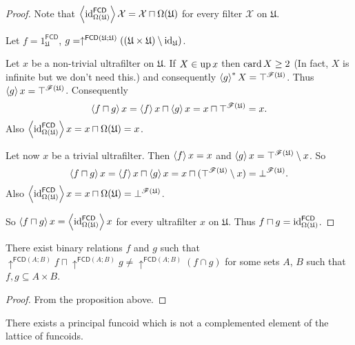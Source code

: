 \begin{proof}
Note that $\left\langle \operatorname{id}_{\Omega(\mathfrak{U})}^{\mathsf{FCD}}\right\rangle\mathcal{X}=\mathcal{X}\sqcap\Omega(\mathfrak{U})$
for every filter $\mathcal{X}$ on $\mathfrak{U}$.

Let $f=1_{\mathfrak{U}}^{\mathsf{FCD}}$, $g=\uparrow^{\mathsf{FCD}(\mathfrak{U};\mathfrak{U})}((\mathfrak{U}\times\mathfrak{U})\setminus\operatorname{id}_{\mathfrak{U}})$.

Let $x$ be a non-trivial ultrafilter on $\mathfrak{U}$. If $X\in\operatorname{up} x$
then $\operatorname{card} X\ge2$ (In fact, $X$ is infinite but we don't need this.)
and consequently $\left\langle g\right\rangle ^{\ast}X=\top^{\mathscr{F}(\mathfrak{U})}$.
Thus $\left\langle g\right\rangle x=\top^{\mathscr{F}(\mathfrak{U})}$. Consequently
\[
\left\langle f\sqcap g\right\rangle x=\left\langle f\right\rangle x\sqcap\left\langle g\right\rangle x=x\sqcap\top^{\mathscr{F}(\mathfrak{U})}=x.
\]
Also $\left\langle \operatorname{id}_{\Omega(\mathfrak{U})}^{\mathsf{FCD}}\right\rangle x=x\sqcap\Omega(\mathfrak{U})=x$.

Let now $x$ be a trivial ultrafilter. Then $\left\langle f\right\rangle x=x$ and $\left\langle g\right\rangle x=\top^{\mathscr{F}(\mathfrak{U})}\setminus x$.
So
\[
\left\langle f\sqcap g\right\rangle x=\left\langle f\right\rangle x\sqcap\left\langle g\right\rangle x=x\sqcap(\top^{\mathscr{F}(\mathfrak{U})}\setminus x)=\bot^{\mathscr{F}(\mathfrak{U})}.
\]
Also $\left\langle \operatorname{id}_{\Omega(\mathfrak{U})}^{\mathsf{FCD}}\right\rangle x=x\sqcap\Omega(\mathfrak{U})=\bot^{\mathscr{F}(\mathfrak{U})}$.

So $\left\langle f\sqcap g\right\rangle x=\left\langle \operatorname{id}_{\Omega(\mathfrak{U})}^{\mathsf{FCD}}\right\rangle x$
for every ultrafilter $x$ on $\mathfrak{U}$. Thus $f\sqcap g=\operatorname{id}_{\Omega(\mathfrak{U})}^{\mathsf{FCD}}$.\end{proof}
\begin{example}
There exist binary relations $f$ and $g$ such that $\uparrow^{\mathsf{FCD}(A;B)}f\sqcap\uparrow^{\mathsf{FCD}(A;B)}g\ne\uparrow^{\mathsf{FCD}(A;B)}(f\cap g)$
for some sets $A$, $B$ such that $f,g\subseteq A\times B$.\end{example}
\begin{proof}
From the proposition above.\end{proof}
\begin{example}
There exists a principal funcoid which is not a complemented element
of the lattice of funcoids.\end{example}
